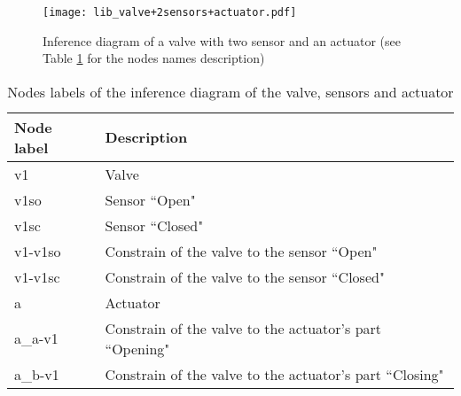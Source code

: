 \begin{figure}[!ht]
	\centering
	\texttt{[image: lib\_valve+2sensors+actuator.pdf]}
	\caption{Inference diagram of a valve with two sensor and an actuator (see
	Table \ref{tbl:id_valve+2sensors+actuator} for the nodes names description)}
	\label{fig:lib_valve+2sensors+actuator}
\end{figure}

\begin{table}[!ht]
\caption{Nodes labels of the inference diagram of the valve, sensors and
actuator}
\centering
	\begin{tabular}{l l}
	\\	
	Node label & Description\\
	\hline
	v1 & Valve\\
	v1so & Sensor ``Open"\\
	v1sc & Sensor ``Closed"\\
	v1-v1so & Constrain of the valve to the sensor ``Open"\\
	v1-v1sc & Constrain of the valve to the sensor ``Closed"\\
	a & Actuator\\
	a\_a-v1 & Constrain of the valve to the actuator's part ``Opening"\\
	a\_b-v1 & Constrain of the valve to the actuator's part ``Closing"
	\end{tabular}
	\label{tbl:id_valve+2sensors+actuator}
\end{table}



\clearpage
\newpage
